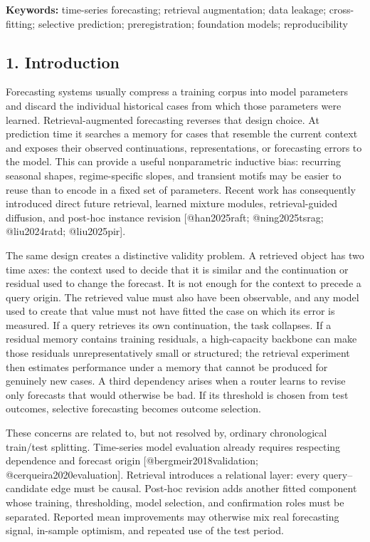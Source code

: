 \documentclass[
]{article}
\begin{document}
\textbf{Keywords:} time-series forecasting; retrieval augmentation; data
leakage; cross-fitting; selective prediction; preregistration;
foundation models; reproducibility

\subsection{1. Introduction}\label{1-introduction}

Forecasting systems usually compress a training corpus into model
parameters and discard the individual historical cases from which those
parameters were learned. Retrieval-augmented forecasting reverses that
design choice. At prediction time it searches a memory for cases that
resemble the current context and exposes their observed continuations,
representations, or forecasting errors to the model. This can provide a
useful nonparametric inductive bias: recurring seasonal shapes,
regime-specific slopes, and transient motifs may be easier to reuse than
to encode in a fixed set of parameters. Recent work has consequently
introduced direct future retrieval, learned mixture modules,
retrieval-guided diffusion, and post-hoc instance revision
{[}@han2025raft; @ning2025tsrag; @liu2024ratd; @liu2025pir{]}.

The same design creates a distinctive validity problem. A retrieved
object has two time axes: the context used to decide that it is similar
and the continuation or residual used to change the forecast. It is not
enough for the context to precede a query origin. The retrieved value
must also have been observable, and any model used to create that value
must not have fitted the case on which its error is measured. If a query
retrieves its own continuation, the task collapses. If a residual memory
contains training residuals, a high-capacity backbone can make those
residuals unrepresentatively small or structured; the retrieval
experiment then estimates performance under a memory that cannot be
produced for genuinely new cases. A third dependency arises when a
router learns to revise only forecasts that would otherwise be bad. If
its threshold is chosen from test outcomes, selective forecasting
becomes outcome selection.

These concerns are related to, but not resolved by, ordinary
chronological train/test splitting. Time-series model evaluation already
requires respecting dependence and forecast origin
{[}@bergmeir2018validation; @cerqueira2020evaluation{]}. Retrieval
introduces a relational layer: every query--candidate edge must be
causal. Post-hoc revision adds another fitted component whose training,
thresholding, model selection, and confirmation roles must be separated.
Reported mean improvements may otherwise mix real forecasting signal,
in-sample optimism, and repeated use of the test period.
\end{document}
